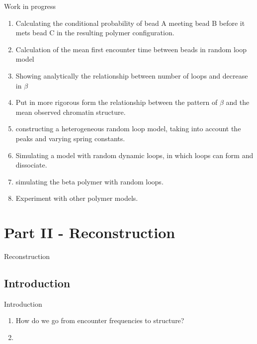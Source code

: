 \documentclass[8pt]{beamer}
\begin{document}
\begin{frame}{Work in progress}
\begin{enumerate}
\item Calculating the conditional probability of bead A meeting bead B before it mets bead C in the resulting polymer configuration. 
\item Calculation of the mean first encounter time between beads in random loop model 
\item Showing analytically the relationship between number of loops and decrease in $\beta$
\item Put in more rigorous form the relationship between the pattern of $\beta$ and the mean observed chromatin structure.
\item constructing a heterogeneous random loop model, taking into account the peaks and varying spring constants.
\item Simulating a model with random dynamic loops, in which loops can form and dissociate.
\item simulating the beta polymer with random loops. 
\item Experiment with other polymer models.
\end{enumerate}
\end{frame}

\section{Part II - Reconstruction}\label{section_partII} 
\begin{frame}
Reconstruction
\end{frame}

\subsection{Introduction}
\begin{frame}{Introduction}
\begin{enumerate}
\item How do we go from encounter frequencies to structure?
\item 
\end{enumerate}
\end{frame}
\end{document}
